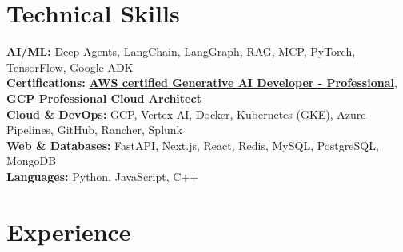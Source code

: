 \documentclass[a4paper,10pt]{article}
\begin{document}
    \section{Technical Skills}
    \vspace{3pt}
    \color[HTML]{1C033C}\textbf{AI/ML:} Deep Agents, LangChain, LangGraph, RAG, MCP, PyTorch, TensorFlow, Google ADK \\[3pt]
    \color[HTML]{1C033C}\textbf{Certifications:} \href{https://www.credly.com/badges/f5a458e1-77e7-4ed7-89e9-adbf7bf0b058/public_url}{\textbf{AWS certified Generative AI Developer - Professional}}, \href{https://www.credly.com/badges/5db92c01-0db4-41fe-9302-869b2659e441/public_url}{\textbf{GCP Professional Cloud Architect}} \\[3pt]
    \color[HTML]{1C033C}\textbf{Cloud \& DevOps:} GCP, Vertex AI, Docker, Kubernetes (GKE), Azure Pipelines, GitHub, Rancher, Splunk \\[3pt]
    \color[HTML]{1C033C}\textbf{Web \& Databases:} FastAPI, Next.js, React, Redis, MySQL, PostgreSQL, MongoDB \\[3pt]
    \color[HTML]{1C033C}\textbf{Languages:} Python, JavaScript, C++
    
    \vspace{6pt}
    \section{Experience}
    
\end{document}
